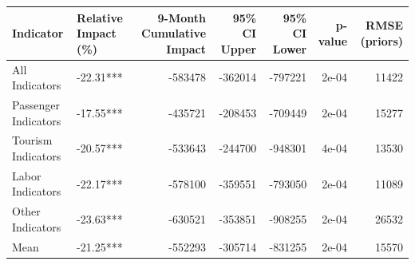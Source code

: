 
\begin{tabular}[t]{l|l|r|r|r|r|r}
\hline
Indicator & Relative Impact (\%) & 9-Month Cumulative Impact & 95\% CI Upper & 95\% CI Lower & p-value & RMSE (priors)\\
\hline
All Indicators & -22.31*** & -583478 & -362014 & -797221 & 2e-04 & 11422\\
\hline
Passenger Indicators & -17.55*** & -435721 & -208453 & -709449 & 2e-04 & 15277\\
\hline
Tourism Indicators & -20.57*** & -533643 & -244700 & -948301 & 4e-04 & 13530\\
\hline
Labor Indicators & -22.17*** & -578100 & -359551 & -793050 & 2e-04 & 11089\\
\hline
Other Indicators & -23.63*** & -630521 & -353851 & -908255 & 2e-04 & 26532\\
\hline
Mean & -21.25*** & -552293 & -305714 & -831255 & 2e-04 & 15570\\
\hline
\end{tabular}
